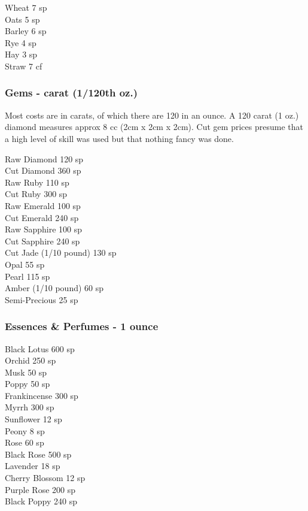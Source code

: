 \begin{multicols}{3}
{Wheat				\hfill 7 sp \\
Oats				\hfill 5 sp \\
Barley				\hfill 6 sp \\
Rye				\hfill 4 sp \\
Hay				\hfill 3 sp \\
Straw				\hfill 7 cf \\

\subsubsection{Gems - carat (1/120th oz.)}

Most costs are in carats, of which there are 120 in an ounce. A 120
carat (1 oz.) diamond measures approx 8 cc (2cm x 2cm x 2cm).	\hfill Cut gem
prices presume that a high level of skill was used but that nothing
fancy was done.


Raw Diamond			\hfill 120 sp \\
Cut Diamond			\hfill 360 sp \\
Raw Ruby			\hfill 110 sp \\
Cut Ruby			\hfill 300 sp \\
Raw Emerald			\hfill 100 sp \\
Cut Emerald			\hfill 240 sp \\
Raw Sapphire			\hfill 100 sp \\
Cut Sapphire			\hfill 240 sp \\
Cut Jade (1/10 pound)		\hfill 130 sp \\
Opal				\hfill 55 sp \\
Pearl				\hfill 115 sp \\
Amber (1/10 pound)		\hfill 60 sp \\
Semi-Precious			\hfill 25 sp \\

\subsubsection{Essences \& Perfumes - 1 ounce}

Black Lotus			\hfill 600 sp \\
Orchid				\hfill 250 sp \\
Musk				\hfill 50 sp \\
Poppy				\hfill 50 sp \\
Frankincense			\hfill 300 sp \\
Myrrh				\hfill 300 sp \\
Sunflower			\hfill 12 sp \\
Peony				\hfill 8 sp \\
Rose				\hfill 60 sp \\
Black Rose			\hfill 500 sp \\
Lavender			\hfill 18 sp \\
Cherry Blossom			\hfill 12 sp \\
Purple Rose			\hfill 200 sp \\
Black Poppy			\hfill 240 sp \\

}
\end{multicols}
